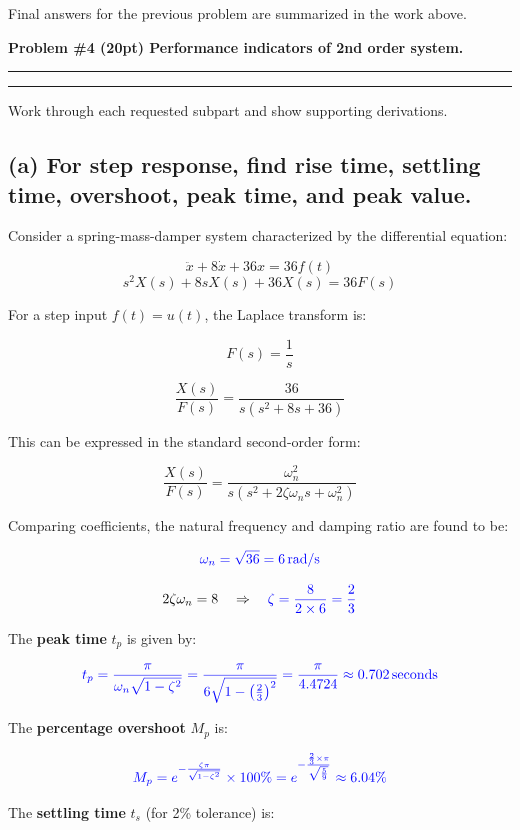 \documentclass[12pt]{article}
\newcommand{\question}[1]{%
  \clearpage
  \vspace{0.5cm}
  {\noindent\normalsize \textbf{#1}}
  \vspace{0.2cm}
  \hrule
  \vspace{0.1cm}
  \hrule
  \vspace{0.3cm}
}
\begin{document}
\newpage
\newpage
\begin{resultsbox}
Final answers for the previous problem are summarized in the work above.
\end{resultsbox}

\question{Problem \#4 (20pt) Performance indicators of 2nd order system.}\label{quest:4}
\begin{stepbox}
Work through each requested subpart and show supporting derivations.
\end{stepbox}

\subsection*{(a) For step response, find rise time, settling time, overshoot, peak time, and peak value.}
Consider a spring-mass-damper system characterized by the differential equation:

\[
	\ddot{x} + 8\dot{x} + 36x = 36f(t)
\]
\[
	s^2 X(s) + 8s X(s) + 36X(s) = 36F(s)
\]

For a step input \( f(t) = u(t) \), the Laplace transform is:

\[
	F(s) = \frac{1}{s}
\]

\[
	\frac{X(s)}{F(s)} = \frac{36}{s(s^2 + 8s + 36)}
\]

This can be expressed in the standard second-order form:

\[
	\frac{X(s)}{F(s)} = \frac{\omega_n^2}{s(s^2 + 2\zeta\omega_n s + \omega_n^2)}
\]

Comparing coefficients, the natural frequency and damping ratio are found to be:

\[
	\textcolor{blue}{\omega_n = \sqrt{36} = 6 \, \text{rad/s}}
\]

\[
	2\zeta\omega_n = 8 \quad \Rightarrow \quad \textcolor{blue}{\zeta = \frac{8}{2 \times 6} = \frac{2}{3}}
\]

The \textbf{peak time} \( t_p \) is given by:

\[
	\textcolor{blue}{t_p = \frac{\pi}{\omega_n \sqrt{1 - \zeta^2}} = \frac{\pi}{6 \sqrt{1 - \left(\frac{2}{3}\right)^2}} = \frac{\pi}{4.4724} \approx 0.702 \, \text{seconds}}
\]

The \textbf{percentage overshoot} \( M_p \) is:

\[
	\textcolor{blue}{M_p = e^{-\frac{\zeta \pi}{\sqrt{1 - \zeta^2}}} \times 100\% = e^{-\frac{\frac{2}{3} \times \pi}{\sqrt{\frac{5}{9}}}} \approx 6.04\%}
\]

The \textbf{settling time} \( t_s \) (for 2\% tolerance) is:
\end{document}
